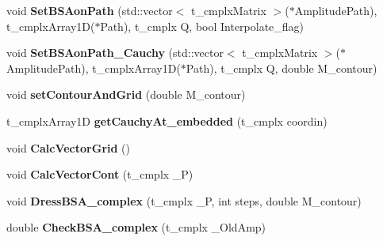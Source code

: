 \begin{DoxyCompactItemize}
\item 
\hypertarget{class_c___b_s_e___hadron___base_ac923ee7b345d687d15dd47d34c802201}{void {\bfseries Set\-B\-S\-Aon\-Path} (std\-::vector$<$ t\-\_\-cmplx\-Matrix $>$($\ast$Amplitude\-Path), t\-\_\-cmplx\-Array1\-D($\ast$Path), t\-\_\-cmplx Q, bool Interpolate\-\_\-flag)}\label{class_c___b_s_e___hadron___base_ac923ee7b345d687d15dd47d34c802201}

\item 
\hypertarget{class_c___b_s_e___hadron___base_a1e8ec6a9f077de3f3b3570b42669fd5d}{void {\bfseries Set\-B\-S\-Aon\-Path\-\_\-\-Cauchy} (std\-::vector$<$ t\-\_\-cmplx\-Matrix $>$($\ast$Amplitude\-Path), t\-\_\-cmplx\-Array1\-D($\ast$Path), t\-\_\-cmplx Q, double M\-\_\-contour)}\label{class_c___b_s_e___hadron___base_a1e8ec6a9f077de3f3b3570b42669fd5d}

\item 
\hypertarget{class_c___b_s_e___hadron___base_a7e690ed44d61209a2dfd15f3258c802a}{void {\bfseries set\-Contour\-And\-Grid} (double M\-\_\-contour)}\label{class_c___b_s_e___hadron___base_a7e690ed44d61209a2dfd15f3258c802a}

\item 
\hypertarget{class_c___b_s_e___hadron___base_a9c65cf1e92debdde3718b574878d9423}{t\-\_\-cmplx\-Array1\-D {\bfseries get\-Cauchy\-At\-\_\-embedded} (t\-\_\-cmplx coordin)}\label{class_c___b_s_e___hadron___base_a9c65cf1e92debdde3718b574878d9423}

\item 
\hypertarget{class_c___b_s_e___hadron___base_a36cea41d9b8bb8218684b2699ac0f9eb}{void {\bfseries Calc\-Vector\-Grid} ()}\label{class_c___b_s_e___hadron___base_a36cea41d9b8bb8218684b2699ac0f9eb}

\item 
\hypertarget{class_c___b_s_e___hadron___base_a3df2644f0ab619833189e9bc7a811169}{void {\bfseries Calc\-Vector\-Cont} (t\-\_\-cmplx \-\_\-\-P)}\label{class_c___b_s_e___hadron___base_a3df2644f0ab619833189e9bc7a811169}

\item 
\hypertarget{class_c___b_s_e___hadron___base_a906234a71db627b3897de6cd62047599}{void {\bfseries Dress\-B\-S\-A\-\_\-complex} (t\-\_\-cmplx \-\_\-\-P, int steps, double M\-\_\-contour)}\label{class_c___b_s_e___hadron___base_a906234a71db627b3897de6cd62047599}

\item 
\hypertarget{class_c___b_s_e___hadron___base_a3b36ae25371d699747047022e8c08608}{double {\bfseries Check\-B\-S\-A\-\_\-complex} (t\-\_\-cmplx \-\_\-\-Old\-Amp)}\label{class_c___b_s_e___hadron___base_a3b36ae25371d699747047022e8c08608}


\end{DoxyCompactItemize}
